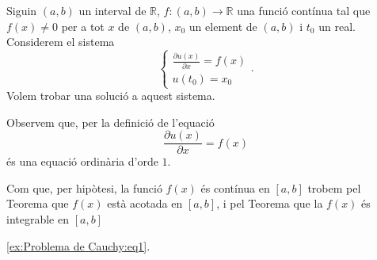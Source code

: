 \documentclass[../Apunts.tex]{subfiles}
\begin{document}
	\begin{example}
		\label{ex:Problema de Cauchy}
		Siguin \((a,b)\) un interval de \(\mathbb{R}\), \(f\colon(a,b)\longrightarrow\mathbb{R}\) una funció contínua tal que \(f(x)\neq0\) per a tot \(x\) de \((a,b)\), \(x_{0}\) un element de \((a,b)\) i \(t_{0}\) un real. Considerem el sistema
		\begin{equation}
			\label{ex:Problema de Cauchy:eq1}
			\begin{cases}
				\displaystyle \frac{\partial u(x)}{\partial x}=f(x) \\
				\displaystyle u(t_{0})=x_{0}
			\end{cases}.
		\end{equation}
		Volem trobar una solució a aquest sistema.
		\begin{solution}
			Observem que, per la definició de  l'equació
			\[\frac{\partial u(x)}{\partial x}=f(x)\]
			és una equació ordinària d'orde \(1\).
			
			Com que, per hipòtesi, la funció \(f(x)\) és contínua en \([a,b]\) trobem pel Teorema  que \(f(x)\) està acotada en \([a,b]\), i pel Teorema  que la \(f(x)\) és integrable en \([a,b]\) 
			
			\eqref{ex:Problema de Cauchy:eq1}.
		\end{solution}
	\end{example}
\end{document}
